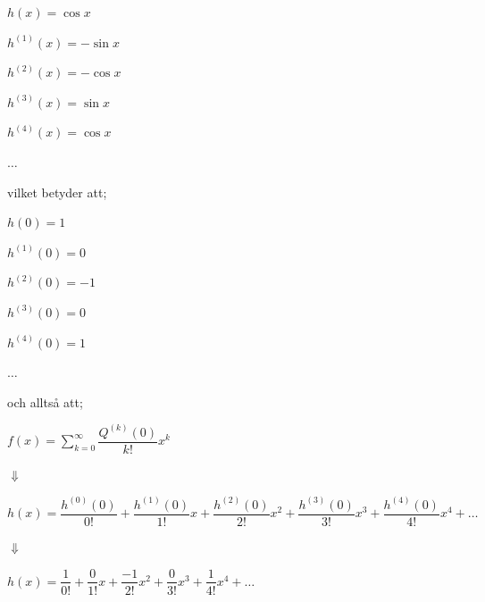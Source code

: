 \documentclass[10pt, a4paper]{amsart}
\begin{document}
\hspace{5ex}
$ h(x) = \cos x $

\hspace{5ex}
$ h^{(1)}(x) = -\sin x $

\hspace{5ex}
$ h^{(2)}(x) = -\cos x $

\hspace{5ex}
$ h^{(3)}(x) = \sin x $

\hspace{5ex}
$ h^{(4)}(x) = \cos x $

\hspace{5ex}
$ \dotso $
\vspace{24pt plus 4pt minus 4pt}

vilket betyder att;
\vspace{24pt plus 4pt minus 4pt}

\hspace{5ex}
$ h(0) = 1 $

\hspace{5ex}
$ h^{(1)}(0) = 0 $

\hspace{5ex}
$ h^{(2)}(0) = -1 $

\hspace{5ex}
$ h^{(3)}(0) = 0 $

\hspace{5ex}
$ h^{(4)}(0) = 1 $

\hspace{5ex}
$ \dotso $
\vspace{24pt plus 4pt minus 4pt}

och alltså att;
\vspace{24pt plus 4pt minus 4pt}

\hspace{5ex}
$ f(x) = \sum\limits_{k=0}^{\infty} \dfrac{Q^{(k)}(0)}{k!}x^k $ 
\bigskip

\hspace{10ex}
$ \Downarrow $
\bigskip

\hspace{5ex}
$ h(x) = \dfrac{h^{(0)}(0)}{0!} + \dfrac{h^{(1)}(0)}{1!}x + \dfrac{h^{(2)}(0)}{2!}x^2 + \dfrac{h^{(3)}(0)}{3!}x^3 + \dfrac{h^{(4)}(0)}{4!}x^4 + \dotso $
\bigskip

\hspace{10ex}
$ \Downarrow $
\bigskip

\hspace{5ex}
$ h(x) = \dfrac{1}{0!} + \dfrac{0}{1!}x + \dfrac{-1}{2!}x^2 + \dfrac{0}{3!}x^3 + \dfrac{1}{4!}x^4 + \dotso $ 
\bigskip
\end{document}
